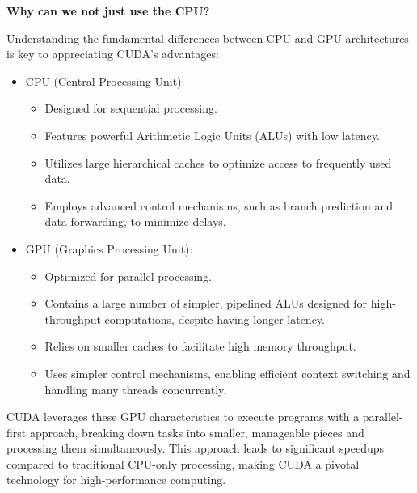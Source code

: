 \highspace
\begin{flushleft}
    \textcolor{Green3}{ \textbf{Why can we not just use the CPU?}}
\end{flushleft}
Understanding the fundamental differences between CPU and GPU architectures is key to appreciating CUDA's advantages:
\begin{itemize}
    \item CPU (Central Processing Unit):
    \begin{itemize}
        \item Designed for sequential processing.
        \item Features powerful Arithmetic Logic Units (ALUs) with low latency.
        \item Utilizes large hierarchical caches to optimize access to frequently used data.
        \item Employs advanced control mechanisms, such as branch prediction and data forwarding, to minimize delays.
    \end{itemize}

    \item GPU (Graphics Processing Unit):
    \begin{itemize}
        \item Optimized for parallel processing.
        \item Contains a large number of simpler, pipelined ALUs designed for high-throughput computations, despite having longer latency.
        \item Relies on smaller caches to facilitate high memory throughput.
        \item Uses simpler control mechanisms, enabling efficient context switching and handling many threads concurrently.
    \end{itemize}
\end{itemize}
CUDA leverages these GPU characteristics to execute programs with a parallel-first approach, breaking down tasks into smaller, manageable pieces and processing them simultaneously. This approach leads to significant speedups compared to traditional CPU-only processing, making CUDA a pivotal technology for high-performance computing.
